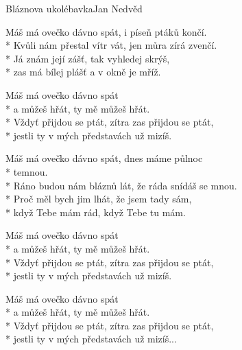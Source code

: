 \documentclass[10.5pt]{book}
\newcommand\tab[1][1cm]{\hspace*{#1}}
\begin{document}
\begin{poem}{Bláznova ukolébavka}{Jan Nedvěd}

\settowidth{\versewidth}{Máš má ovečko dávno spát, dnes máme půlnoc fakt temnou.}

Máš má ovečko dávno spát, i píseň ptáků končí.\\*
Kvůli nám přestal vítr vát, jen můra zírá zvenčí.\\*
Já znám její zášť, tak vyhledej skrýš,\\*
zas má bílej plášť a v okně je mříž.

Máš má ovečko dávno spát\\*
a můžeš hřát, ty mě můžeš hřát.\\*
Vždyť přijdou se ptát, zítra zas přijdou se ptát,\\*
jestli ty v mých představách už mizíš.

Máš má ovečko dávno spát, dnes máme půlnoc\\*
\tab temnou.\\*
Ráno budou nám bláznů lát, že ráda snídáš se mnou.\\*
Proč měl bych jim lhát, že jsem tady sám,\\*
když Tebe mám rád, když Tebe tu mám.

Máš má ovečko dávno spát\\*
a můžeš hřát, ty mě můžeš hřát.\\*
Vždyť přijdou se ptát, zítra zas přijdou se ptát,\\*
jestli ty v mých představách už mizíš.

Máš má ovečko dávno spát\\*
a můžeš hřát, ty mě můžeš hřát.\\*
Vždyť přijdou se ptát, zítra zas přijdou se ptát,\\*
jestli ty v mých představách už mizíš...

\end{poem}
\end{document}
